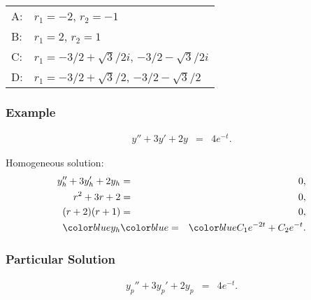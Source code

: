 {\begin{frame}
{        \vfill

        \begin{tabular}{ll}
          A: & $r_1=-2$, $r_2=-1$ \\ [12pt]
          B: & $r_1=2$, $r_2=1$ \\ [12pt]
          C: & $r_1 = -3/2+\sqrt{3}/2 i$, $-3/2-\sqrt{3}/2i$ \\ [12pt]
          D: & $r_1 = -3/2+\sqrt{3}/2$, $-3/2-\sqrt{3}/2$ \\
        \end{tabular}

        \vfill

    }\fi
  

\end{frame}
}


\begin{frame}
  \frametitle{Example}

  \begin{eqnarray*}
    y'' + 3y' + 2y & = & 4 e^{-t}.
  \end{eqnarray*}

  {
    Homogeneous solution:
    \begin{eqnarray*}
      y_h'' + 3y_h' + 2y_h & = & 0, \\
      r^2 + 3r + 2 & = & 0, \\
      (r+2)(r+1) & = & 0, \\
      \blueText{y_h} & \blueText{=} & \blueText{C_1 e^{-2t} + C_2 e^{-t}}.
    \end{eqnarray*}
  }

\end{frame}

\begin{frame}
  \frametitle{Particular Solution}


  \begin{eqnarray*}
    y_p'' + 3y_p' + 2y_p & = & 4 e^{-t}.
  \end{eqnarray*}



\end{frame}


